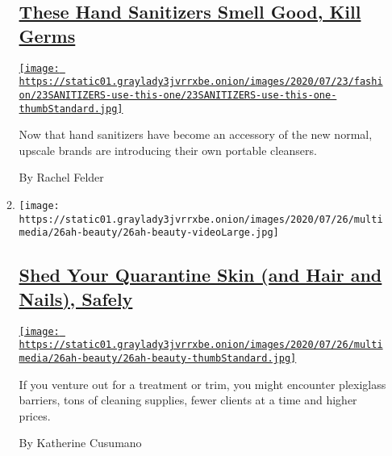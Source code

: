 \begin{enumerate}
\begin{enumerate}
    \hypertarget{these-hand-sanitizers-smell-good-kill-germs}{%
    \subsection{\texorpdfstring{\href{/2020/07/22/style/these-hand-sanitizers-smell-good-kill-germs.html}{These
    Hand Sanitizers Smell Good, Kill
    Germs}}{These Hand Sanitizers Smell Good, Kill Germs}}\label{these-hand-sanitizers-smell-good-kill-germs}}

    \href{/2020/07/22/style/these-hand-sanitizers-smell-good-kill-germs.html}{\texttt{[image: https://static01.graylady3jvrrxbe.onion/images/2020/07/23/fashion/23SANITIZERS-use-this-one/23SANITIZERS-use-this-one-thumbStandard.jpg]}}

    Now that hand sanitizers have become an accessory of the new normal,
    upscale brands are introducing their own portable cleansers.

    By Rachel Felder
  \item
    \texttt{[image: https://static01.graylady3jvrrxbe.onion/images/2020/07/26/multimedia/26ah-beauty/26ah-beauty-videoLarge.jpg]}

    \hypertarget{shed-your-quarantine-skin-and-hair-and-nails-safely}{%
    \subsection{\texorpdfstring{\href{/2020/07/25/at-home/coronavirus-salons.html}{Shed
    Your Quarantine Skin (and Hair and Nails),
    Safely}}{Shed Your Quarantine Skin (and Hair and Nails), Safely}}\label{shed-your-quarantine-skin-and-hair-and-nails-safely}}

    \href{/2020/07/25/at-home/coronavirus-salons.html}{\texttt{[image: https://static01.graylady3jvrrxbe.onion/images/2020/07/26/multimedia/26ah-beauty/26ah-beauty-thumbStandard.jpg]}}

    If you venture out for a treatment or trim, you might encounter
    plexiglass barriers, tons of cleaning supplies, fewer clients at a
    time and higher prices.

    By Katherine Cusumano
  \end{enumerate}
\end{enumerate}

